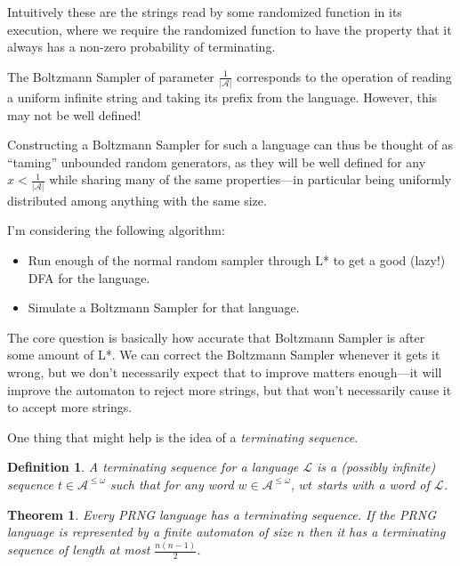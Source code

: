 \documentclass[a4paper]{book}
\newtheorem{definition}{Definition}
\newtheorem{theorem}{Theorem}
\begin{document}
Intuitively these are the strings read by some randomized function in its execution,
where we require the randomized function to have the property that it always has a non-zero probability of terminating.

The Boltzmann Sampler of parameter \(\frac{1}{|\mathcal{A}|}\) corresponds to the operation of reading a uniform infinite string and taking its prefix from the language.
However, this may not be well defined!

Constructing a Boltzmann Sampler for such a language can thus be thought of as ``taming'' unbounded random generators,
as they will be well defined for any \(x < \frac{1}{|\mathcal{A}|}\) while sharing many of the same properties---in
particular being uniformly distributed among anything with the same size.

I'm considering the following algorithm:

\begin{itemize}
\item Run enough of the normal random sampler through L* to get a good (lazy!) DFA for the language.
\item Simulate a Boltzmann Sampler for that language.
\end{itemize}

The core question is basically how accurate that Boltzmann Sampler is after some amount of L*.
We can correct the Boltzmann Sampler whenever it gets it wrong,
but we don't necessarily expect that to improve matters enough---it will improve the automaton to reject more strings,
but that won't necessarily cause it to accept more strings.

One thing that might help is the idea of a \emph{terminating sequence}.

\begin{definition}
A terminating sequence for a language \(\mathcal{L}\) is a (possibly infinite) sequence \(t \in \mathcal{A}^{\leq \omega}\) such that for any word \(w \in  \mathcal{A}^{\leq \omega}\), \(wt\) starts with a word of \(\mathcal{L}\).
\end{definition}

\begin{theorem}
Every PRNG language has a terminating sequence.
If the PRNG language is represented by a finite automaton of size \(n\) then it has a terminating sequence of length at most \(\frac{n(n - 1)}{2}\).
\end{theorem}
\end{document}
